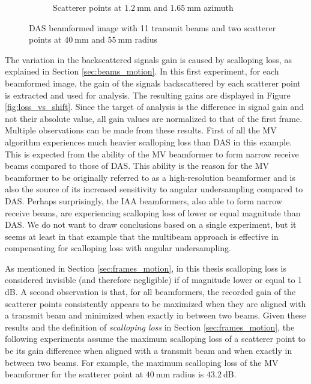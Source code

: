 \begin{figure}[ht]
\begin{subfigure}[t]{0.48\linewidth}
        \caption{Scatterer points at $1.2~$mm and $1.65~$mm azimuth}
        \label{fig:DAS_frame2}
    \end{subfigure}
	\caption{DAS beamformed image with 11 transmit beams and two scatterer points at $40~$mm and $55~$mm radius}
	\label{fig:DAS_frame}
\end{figure}

The variation in the backscattered signals gain is caused by scalloping loss, as explained in Section \ref{sec:beams_motion}. In this first experiment, for each beamformed image, the gain of the signals backscattered by each scatterer point is extracted and used for analysis.
The resulting gains are displayed in Figure \ref{fig:loss_vs_shift}.
Since the target of analysis is the difference in signal gain and not their absolute value, all gain values are normalized to that of the first frame.
Multiple observations can be made from these results. First of all the MV algorithm experiences much heavier scalloping loss than DAS in this example.
This is expected from the ability of the MV beamformer to form narrow receive beams compared to those of DAS.
This ability is the reason for the MV beamformer to be originally referred to as a high-resolution beamformer and is also the source of its increased sensitivity to angular undersampling compared to DAS.
Perhaps surprisingly, the IAA beamformers, also able to form narrow receive beams, are experiencing scalloping loss of lower or equal magnitude than DAS.
We do not want to draw conclusions based on a single experiment, but it seems at least in that example that the multibeam approach is effective in compensating for scalloping loss with angular undersampling.

As mentioned in Section \ref{sec:frames_motion}, in this thesis scalloping loss is considered invisible (and therefore negligible) if of magnitude lower or equal to 1 dB. 
A second observation is that, for all beamformers, the recorded gain of the scatterer points consistently appears to be maximized when they are aligned with a transmit beam and minimized when exactly in between two beams.
Given these results and the definition of \textit{scalloping loss} in Section \ref{sec:frames_motion}, the following experiments assume the maximum scalloping loss of a scatterer point to be its gain difference when aligned with a transmit beam and when exactly in between two beams. For example, the maximum scalloping loss of the MV beamformer for the scatterer point at $40~$mm radius is $43.2~$dB.

